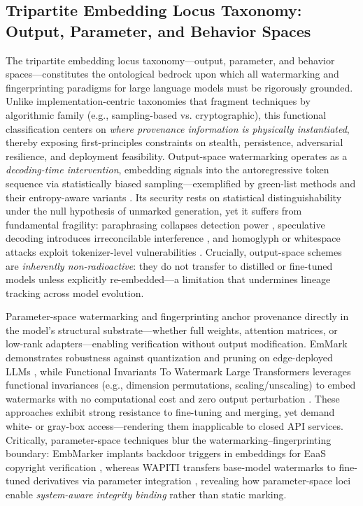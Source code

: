 \documentclass[11pt,a4paper]{article}
\begin{document}
\subsection{Tripartite Embedding Locus Taxonomy: Output, Parameter, and Behavior Spaces}


The tripartite embedding locus taxonomy---output, parameter, and behavior spaces---constitutes the ontological bedrock upon which all watermarking and fingerprinting paradigms for large language models must be rigorously grounded. Unlike implementation-centric taxonomies that fragment techniques by algorithmic family (e.g., sampling-based vs. cryptographic), this functional classification centers on \emph{where provenance information is physically instantiated}, thereby exposing first-principles constraints on stealth, persistence, adversarial resilience, and deployment feasibility. Output-space watermarking operates as a \emph{decoding-time intervention}, embedding signals into the autoregressive token sequence via statistically biased sampling---exemplified by green-list methods \cite{arxiv:1701.04082} and their entropy-aware variants \cite{doi:10.1038/s41586-024-08025-4}. Its security rests on statistical distinguishability under the null hypothesis of unmarked generation, yet it suffers from fundamental fragility: paraphrasing collapses detection power \cite{arxiv:2303.13408}, speculative decoding introduces irreconcilable interference \cite{doi:10.1038/s41586-024-08025-4}, and homoglyph or whitespace attacks exploit tokenizer-level vulnerabilities \cite{arxiv:2402.16187}. Crucially, output-space schemes are \emph{inherently non-radioactive}: they do not transfer to distilled or fine-tuned models unless explicitly re-embedded---a limitation that undermines lineage tracking across model evolution.

Parameter-space watermarking and fingerprinting anchor provenance directly in the model's structural substrate---whether full weights, attention matrices, or low-rank adapters---enabling verification without output modification. EmMark demonstrates robustness against quantization and pruning on edge-deployed LLMs \cite{doi:10.1145/3649329.3655674}, while Functional Invariants To Watermark Large Transformers leverages functional invariances (e.g., dimension permutations, scaling/unscaling) to embed watermarks with no computational cost and zero output perturbation \cite{doi:10.1109/icassp48485.2024.10447264}. These approaches exhibit strong resistance to fine-tuning and merging, yet demand white- or gray-box access---rendering them inapplicable to closed API services. Critically, parameter-space techniques blur the watermarking--fingerprinting boundary: EmbMarker implants backdoor triggers in embeddings for EaaS copyright verification \cite{doi:10.18653/v1/2023.acl-long.423}, whereas WAPITI transfers base-model watermarks to fine-tuned derivatives via parameter integration \cite{arxiv:2410.06467}, revealing how parameter-space loci enable \emph{system-aware integrity binding} rather than static marking.
\end{document}
